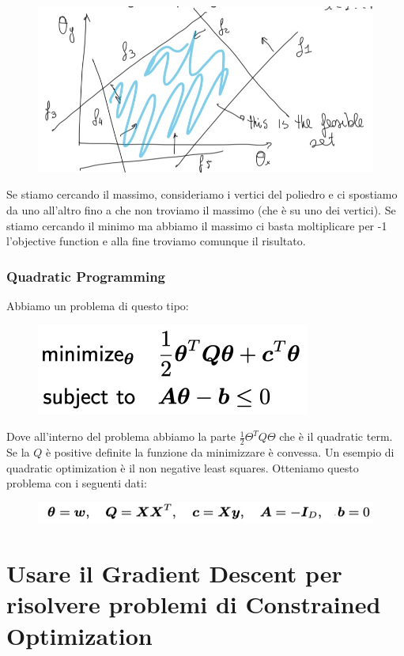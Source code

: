 \documentclass[14pt]{extreport}
\begin{document}
\begin{figure}[H]
	\centering
	\includegraphics[width=0.6\linewidth]{279.jpeg}
\end{figure}

Se stiamo cercando il massimo, consideriamo i vertici del poliedro e ci spostiamo da uno all'altro fino a che non troviamo il massimo (che è su uno
dei vertici). Se stiamo cercando il minimo ma abbiamo il massimo ci basta moltiplicare per -1 l'objective function e alla fine troviamo comunque il
risultato.

\subsubsection{Quadratic Programming}

Abbiamo un problema di questo tipo:

\begin{figure}[H]
	\centering
	\includegraphics[width=0.4\linewidth]{280.jpeg}
\end{figure}

Dove all'interno del problema abbiamo la parte $\frac{1}{2}\Theta^TQ\Theta$ che è il quadratic term. Se la $Q$ è positive definite la funzione da
minimizzare è convessa. Un esempio di quadratic optimization è il non negative least squares. Otteniamo questo problema con i seguenti dati:

\begin{figure}[H]
	\centering
	\includegraphics[width=0.7\linewidth]{281.jpeg}
\end{figure}

\section{Usare il Gradient Descent per risolvere problemi di Constrained Optimization}
\end{document}
